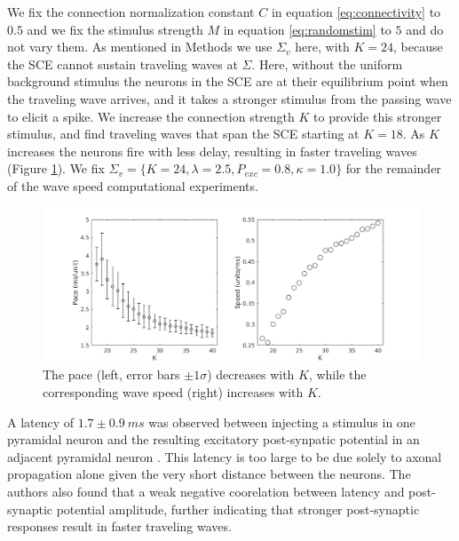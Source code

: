\documentclass[12pt]{article}
\begin{document}
We fix the connection normalization constant $C$ in equation \ref{eq:connectivity} to $0.5$ and we fix the stimulus strength $M$ in equation \ref{eq:randomstim} to $5$ and do not vary them.
As mentioned in Methods we use $\Sigma_v$ here, with $K=24$, because the SCE cannot sustain traveling waves at $\Sigma$. 
Here, without the uniform background stimulus the neurons in the SCE are at their equilibrium point when the traveling wave arrives, and it takes a stronger stimulus from the passing wave to elicit a spike.
We increase the connection strength $K$ to provide this stronger stimulus, and find traveling waves that span the SCE starting at $K=18$. 
As $K$ increases the neurons fire with less delay, resulting in faster traveling waves (Figure \ref{fig:delay_k}).
We fix $\Sigma_v = \{K=24,\lambda=2.5,P_{exc}=0.8,\kappa=1.0 \}$ for the remainder of the wave speed computational experiments.
\begin{figure}[!htb]
 \caption{The pace (left, error bars $\pm 1 \sigma$) decreases with $K$, while the corresponding wave speed (right) increases with $K$. }
 \label{fig:delay_k}
 \centering
   \includegraphics[width=\textwidth]{fig/WaveSpeed_K}
\end{figure}

\color{red}A latency of $1.7\pm 0.9\ ms$ was observed between injecting a stimulus in one pyramidal neuron and the resulting excitatory post-synpatic potential in an adjacent pyramidal neuron \parencite{Markram1997}.
This latency is too large to be due solely to axonal propagation alone given the very short distance between the neurons. 
The authors also found that a weak negative coorelation between latency and post-synaptic potential amplitude, further indicating that stronger post-synaptic responses result in faster traveling waves. 
\color{black}

\FloatBarrier
\end{document}
